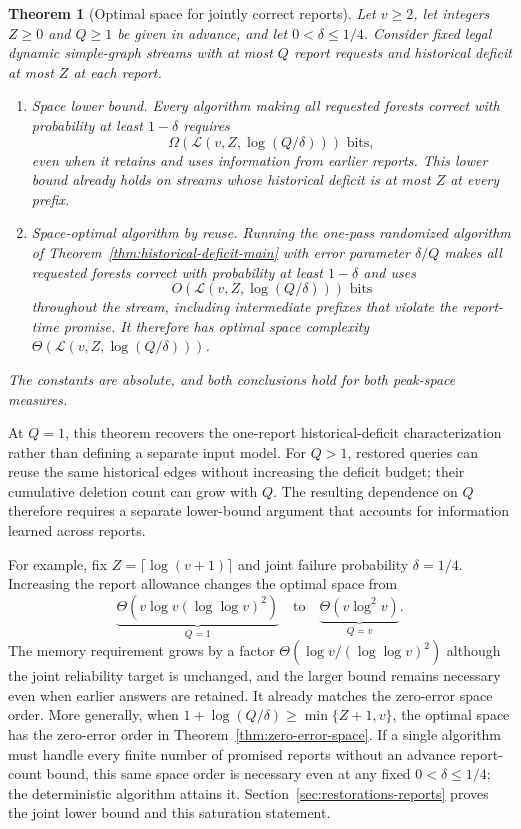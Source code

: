 \documentclass[11pt,letterpaper]{article}
\newtheorem{theorem}{Theorem}[section]
\numberwithin{equation}{section}
\begin{document}
\begin{theorem}[Optimal space for jointly correct reports]
\label{thm:joint-report-lower}
\label{thm:joint-report-space}
Let $v\ge2$, let integers $Z\ge0$ and $Q\ge1$ be given in advance, and let $0<\delta\le1/4$.
Consider fixed legal dynamic simple-graph streams with at most $Q$ report requests and historical deficit at most $Z$ at each report.
\begin{enumerate}
\item \emph{Space lower bound.} Every algorithm making all requested forests correct with probability at least $1-\delta$ requires
\[
\Omega\!\left(\mathcal L(v,Z,\log(Q/\delta))\right)\text{ bits},
\]
even when it retains and uses information from earlier reports.
This lower bound already holds on streams whose historical deficit is at most $Z$ at every prefix.
\item \emph{Space-optimal algorithm by reuse.} Running the one-pass randomized algorithm of Theorem~\ref{thm:historical-deficit-main} with error parameter $\delta/Q$ makes all requested forests correct with probability at least $1-\delta$ and uses
\[
O\!\left(\mathcal L(v,Z,\log(Q/\delta))\right)\text{ bits}
\]
throughout the stream, including intermediate prefixes that violate the report-time promise.
It therefore has optimal space complexity $\Theta(\mathcal L(v,Z,\log(Q/\delta)))$.
\end{enumerate}
The constants are absolute, and both conclusions hold for both peak-space measures.
\end{theorem}

At $Q=1$, this theorem recovers the one-report historical-deficit characterization rather than defining a separate input model.
For $Q>1$, restored queries can reuse the same historical edges without increasing the deficit budget; their cumulative deletion count can grow with $Q$.
The resulting dependence on $Q$ therefore requires a separate lower-bound argument that accounts for information learned across reports.

For example, fix $Z=\lceil\log(v+1)\rceil$ and joint failure probability $\delta=1/4$.
Increasing the report allowance changes the optimal space from
\[
 \underbrace{\Theta\!\left(v\log v(\log\log v)^2\right)}_{Q=1}
 \quad\text{to}\quad
 \underbrace{\Theta(v\log^2v)}_{Q=v}.
\]
The memory requirement grows by a factor $\Theta(\log v/(\log\log v)^2)$ although the joint reliability target is unchanged, and the larger bound remains necessary even when earlier answers are retained.
It already matches the zero-error space order.
More generally, when $1+\log(Q/\delta)\ge\min\{Z+1,v\}$, the optimal space has the zero-error order in Theorem~\ref{thm:zero-error-space}.
If a single algorithm must handle every finite number of promised reports without an advance report-count bound, this same space order is necessary even at any fixed $0<\delta\le1/4$; the deterministic algorithm attains it.
Section~\ref{sec:restorations-reports} proves the joint lower bound and this saturation statement.
\end{document}

